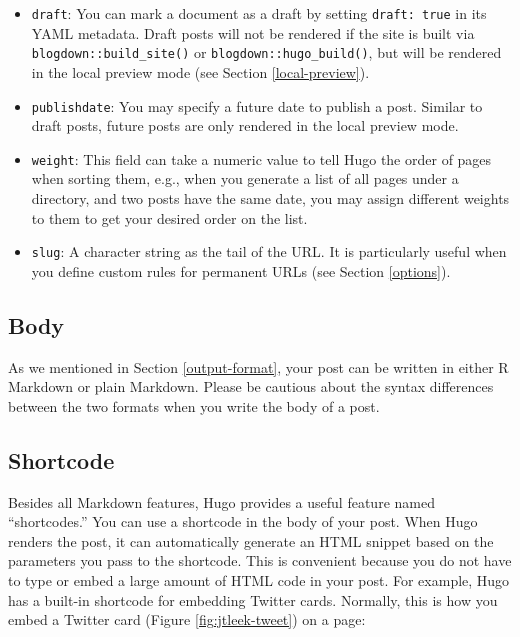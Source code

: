 \documentclass[12pt,]{krantz}
\theoremstyle{definition}
\theoremstyle{definition}
\theoremstyle{definition}
\theoremstyle{remark}
\begin{document}
\begin{itemize}
\item
  \texttt{draft}: You can mark a document as a draft by
  setting \texttt{draft:\ true} in its YAML metadata. Draft posts will
  not be rendered if the site is built via
  \texttt{blogdown::build\_site()} or \texttt{blogdown::hugo\_build()},
  but will be rendered in the local preview mode (see Section
  \ref{local-preview}).
\item
  \texttt{publishdate}: You may specify a future
  date to publish a post. Similar to draft posts,
  future posts are only rendered in the local preview mode.
\item
  \texttt{weight}: This field can take a numeric value to tell Hugo the
  order of pages when sorting them, e.g., when you
  generate a list of all pages under a directory, and two posts have the
  same date, you may assign different weights to them to get your
  desired order on the list.
\item
  \texttt{slug}: A character string as the tail of the URL. It is
  particularly useful when you define custom rules for permanent URLs
  (see Section \ref{options}).
\end{itemize}

\subsection{Body}\label{body}

As we mentioned in Section \ref{output-format}, your post can be written
in either R Markdown or plain Markdown. Please be cautious about the
syntax differences between the two formats when you write the body of a
post.

\subsection{Shortcode}\label{shortcode}

Besides all Markdown features, Hugo provides a useful feature named
``shortcodes.'' You can use a shortcode in the body of
your post. When Hugo renders the post, it can automatically generate an
HTML snippet based on the parameters you pass to the shortcode. This is
convenient because you do not have to type or embed a large amount of
HTML code in your post. For example, Hugo has a built-in shortcode for
embedding Twitter cards. Normally, this is how you embed a Twitter card
(Figure \ref{fig:jtleek-tweet}) on a page:
\end{document}

